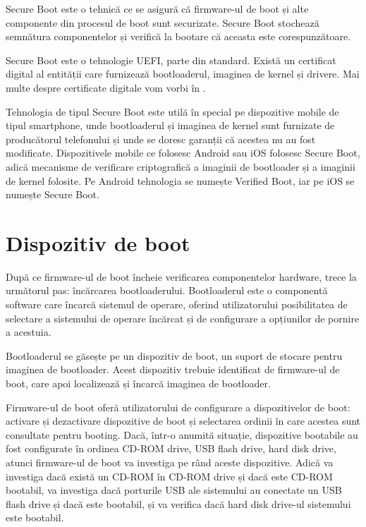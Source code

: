 Secure Boot este o tehnică ce se asigură că firmware-ul de boot și alte componente
din procesul de boot sunt securizate. Secure Boot stochează semnătura
componentelor și verifică la bootare că aceasta este corespunzătoare.

Secure Boot este o tehnologie UEFI, parte din standard. Există un certificat digital al
entității care furnizează bootloaderul, imaginea de kernel și drivere. Mai
multe despre certificate digitale vom vorbi în .

Tehnologia de tipul Secure Boot este utilă în special pe dispozitive mobile de
tipul smartphone, unde bootloaderul și imaginea de kernel sunt furnizate de
producătorul telefonului și unde se doresc garanții că acestea nu au fost modificate.
Dispozitivele mobile ce folosesc Android sau iOS folosesc Secure Boot, adică
mecanisme de verificare criptografică a imaginii de bootloader și a imaginii de
kernel folosite. Pe Android tehnologia se numește Verified Boot, iar pe iOS se
numește Secure Boot.

\section{Dispozitiv de boot}
\label{sec:boot:bootdev}

După ce firmware-ul de boot încheie verificarea componentelor hardware, trece la următorul
pas: încărcarea bootloaderului. Bootloaderul este o componentă software care
încarcă sistemul de operare, oferind utilizatorului posibilitatea de selectare a
sistemului de operare încărcat și de configurare a opțiunilor de pornire a
acestuia.

Bootloaderul se găsește pe un dispozitiv de boot, un suport de stocare pentru
imaginea de bootloader. Acest dispozitiv trebuie identificat de firmware-ul de
boot, care apoi localizează și încarcă imaginea de bootloader.

Firmware-ul de boot oferă utilizatorului de
configurare a dispozitivelor de boot: activare și dezactivare dispozitive de
boot și selectarea ordinii în care acestea sunt consultate pentru booting.
Dacă, într-o anumită situație, dispozitive bootabile au fost configurate în ordinea
CD-ROM drive, USB flash drive, hard disk drive, atunci firmware-ul de boot va investiga pe rând aceste dispozitive.
Adică va
investiga dacă există un CD-ROM în CD-ROM drive și dacă este CD-ROM bootabil, va
investiga dacă porturile USB ale sistemului au conectate un USB flash drive și dacă
este bootabil, și va verifica dacă hard disk drive-ul sistemului este bootabil.

